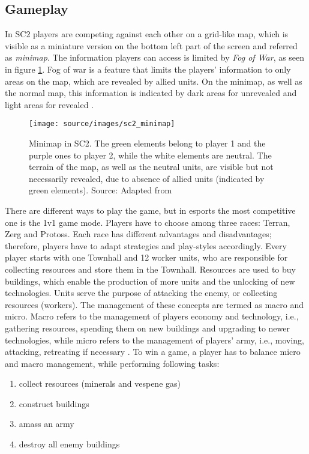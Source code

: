\subsection{Gameplay}
In SC2 players are competing against each other on a grid-like map, which is visible as a miniature version on the bottom left part of the screen and referred as \textit{minimap}. The information players can access is limited by \textit{Fog of War}, as seen in figure \ref{fig:sc2_minimap}. Fog of war is a feature that limits the players' information to only areas on the map, which are revealed by allied units. On the minimap, as well as the normal map, this information is indicated by dark areas for unrevealed and light areas for revealed \cite{liquipedia_fog}. 
\begin{figure}[H]%
\centering
\texttt{[image: source/images/sc2\_minimap]}%
\caption[Minimap in SC2]{Minimap in SC2. The green elements belong to player 1 and the purple ones to player 2, while the white elements are neutral. The terrain of the map, as well as the neutral units, are visible but not necessarily revealed, due to absence of allied units (indicated by green elements). Source: Adapted from \protect\cite{Starcraf92:online}}%
\label{fig:sc2_minimap}%
\end{figure}
There are different ways to play the game, but in esports the most competitive one is the 1v1 game mode. Players have to choose among three races: Terran, Zerg and Protoss. Each race has different advantages and disadvantages; therefore, players have to adapt strategies and play-styles accordingly. Every player starts with one Townhall and 12 worker units, who are responsible for collecting resources and store them in the Townhall. Resources are used to buy buildings, which enable the production of more units and the unlocking of new technologies. Units serve the purpose of attacking the enemy, or collecting resources (workers). The management of these concepts are termed as macro and micro. Macro refers to the management of players economy and technology, i.e., gathering resources, spending them on new buildings and upgrading to newer technologies, while micro refers to the management of players' army, i.e., moving, attacking, retreating if necessary \cite{liquipedia_sc2}. To win a game, a player has to balance micro and macro management, while performing following tasks:
\begin{enumerate} 
	\item collect resources (minerals and vespene gas)
	\item construct buildings
	\item amass an army
	\item destroy all enemy buildings \cite{2017arXiv170804782V}
\end{enumerate}

